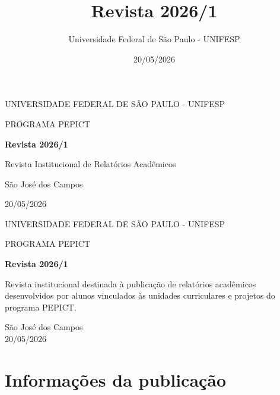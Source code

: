 \documentclass[12pt,openright,oneside,a4paper]{report}
\title{Revista 2026/1}
\author{Universidade Federal de São Paulo - UNIFESP}
\date{20/05/2026}
\begin{document}
\begin{titlepage}
    \centering
    \vspace*{2cm}
    {\Large UNIVERSIDADE FEDERAL DE SÃO PAULO - UNIFESP \par}
    \vspace{0.5cm}
    {\large PROGRAMA PEPICT \par}
    \vfill
    {\bfseries\LARGE Revista 2026/1 \par}
    \vspace{1cm}
    {\large Revista Institucional de Relatórios Acadêmicos \par}
    \vfill
    {\large São José dos Campos\par}
    {\large 20/05/2026 \par}
\end{titlepage}

\begin{titlepage}
    \centering
    {\Large UNIVERSIDADE FEDERAL DE SÃO PAULO - UNIFESP \par}
    \vspace{0.5cm}
    {\large PROGRAMA PEPICT \par}
    \vspace{4cm}
    {\bfseries\LARGE Revista 2026/1 \par}
    \vspace{2cm}
    \hspace{.45\textwidth}
    \begin{minipage}{.5\textwidth}
        \onehalfspacing
        Revista institucional destinada à publicação de relatórios acadêmicos desenvolvidos por alunos vinculados às unidades curriculares e projetos do programa PEPICT.
    \end{minipage}
    \vfill
    \begin{center}
        São José dos Campos \\
        20/05/2026
    \end{center}
\end{titlepage}

\chapter*{Informações da publicação}
\thispagestyle{empty}
\end{document}

